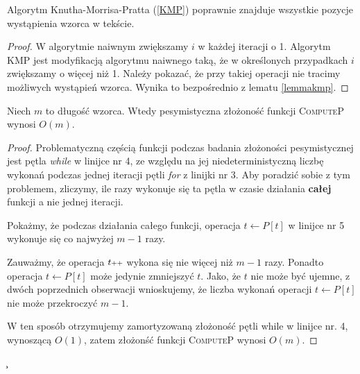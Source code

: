 \begin{theorem}
	Algorytm Knutha-Morrisa-Pratta (\ref{KMP}) poprawnie znajduje wszystkie pozycje wystąpienia wzorca w tekście. 
	\begin{proof}
		W algorytmie naiwnym zwiększamy $i$ w każdej iteracji o 1. Algorytm KMP jest modyfikacją algorytmu naiwnego taką, że w określonych przypadkach $i$ zwiększamy o więcej niż 1. Należy pokazać, że przy takiej operacji nie tracimy możliwych wystąpień wzorca. Wynika to bezpośrednio z lematu \ref{lemmakmp}.
	\end{proof}
\end{theorem}

\begin{lemma}
	\label{zlozonoscComputeP}
	Niech $m$ to długość wzorca. Wtedy pesymistyczna złożoność funkcji \textsc{ComputeP} wynosi $O(m)$.
	\begin{proof}
		Problematyczną częścią funkcji podczas badania złożoności pesymistycznej jest pętla \textit{while} w linijce nr 4, 
		ze względu na jej niedeterministyczną liczbę wykonań podczas jednej iteracji pętli \textit{for} z linijki nr 3. Aby poradzić sobie z tym problemem, zliczymy, ile razy wykonuje się ta pętla
		w czasie działania \textbf{całej} funkcji a nie jednej iteracji.
		 
		Pokażmy, że podczas działania całego funkcji, operacja $t \gets P[t]$ w linijce nr 5 wykonuje się co najwyżej $m-1$ razy.
		
		Zauważmy, że operacja $t\scalebox{0.75}{++}$ wykona się nie więcej niż $m-1$ razy.
		Ponadto operacja $t \gets P[t]$ może jedynie zmniejszyć $t$. Jako, że $t$ nie może
		być ujemne, z dwóch poprzednich obserwacji wnioskujemy, że
		liczba wykonań operacji $t \gets P[t]$ nie może przekroczyć $m-1$.
		
		W ten sposób otrzymujemy zamortyzowaną złożoność pętli while w linijce nr. 4,
		wynoszącą $O(1)$, zatem złożonść funkcji \textsc{ComputeP} wynosi $O(m)$.
		
	\end{proof}	
	\c
\end{lemma}


